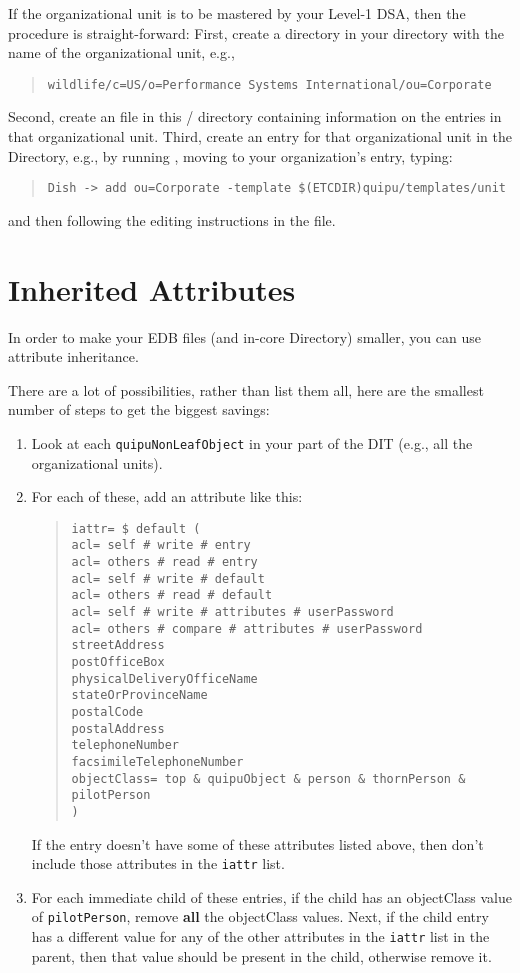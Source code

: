 If the organizational unit is to be mastered by your Level-1 DSA,
then the procedure is straight-forward:
First,
create a directory in your  directory with
the name of the organizational unit, e.g.,
\begin{quote}\smaller\begin{verbatim}
wildlife/c=US/o=Performance Systems International/ou=Corporate
\end{verbatim}\end{quote}
Second,
create an  file in this \unix/ directory containing information on
the entries in that organizational unit.
Third,
create an entry for that organizational unit in the Directory,
e.g., by running , moving to your organization's entry,
typing:
\begin{quote}\small\begin{verbatim}
Dish -> add ou=Corporate -template $(ETCDIR)quipu/templates/unit
\end{verbatim}\end{quote}
and then following the editing instructions in the file.

\section	{Inherited Attributes}
In order to make your EDB files (and in-core Directory) smaller,
you can use attribute inheritance.

There are a lot of possibilities,
rather than list them all,
here are the smallest number of steps to get the biggest savings:
\begin{enumerate}
\item	Look at each \verb"quipuNonLeafObject" in your part of the DIT
(e.g., all the organizational units).

\item	For each of these,
add an attribute like this:
\begin{quote}\smaller\begin{verbatim}
iattr= $ default (
acl= self # write # entry
acl= others # read # entry
acl= self # write # default
acl= others # read # default
acl= self # write # attributes # userPassword
acl= others # compare # attributes # userPassword
streetAddress
postOfficeBox
physicalDeliveryOfficeName
stateOrProvinceName
postalCode
postalAddress
telephoneNumber
facsimileTelephoneNumber
objectClass= top & quipuObject & person & thornPerson & pilotPerson
)
\end{verbatim}\end{quote}
If the entry doesn't have some of these attributes listed above,
then don't include those attributes in the \verb"iattr" list.

\item	For each immediate child of these entries,
if the child has an objectClass value of \verb"pilotPerson",
remove {\bf all\/} the objectClass values.
Next,
if the child entry has a different value for any of the other attributes in
the \verb"iattr" list in the parent,
then that value should be present in the child,
otherwise remove it.  
\end{enumerate}

